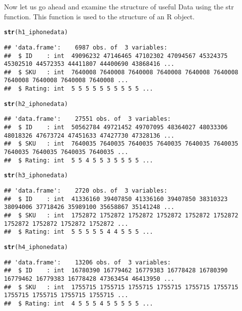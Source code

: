 \documentclass{article}\usepackage[]{graphicx}\usepackage[]{color}
\makeatletter
\newcommand{\hlstd}[1]{\textcolor[rgb]{0.345,0.345,0.345}{#1}}%
\newcommand{\hlkwd}[1]{\textcolor[rgb]{0.737,0.353,0.396}{\textbf{#1}}}%
\newenvironment{kframe}{%
 \def\at@end@of@kframe{}%
 \ifinner\ifhmode%
  \def\at@end@of@kframe{\end{minipage}}%
  \begin{minipage}{\columnwidth}%
 \fi\fi%
 \def\FrameCommand##1{\hskip\@totalleftmargin \hskip-\fboxsep
 \colorbox{shadecolor}{##1}\hskip-\fboxsep
     \hskip-\linewidth \hskip-\@totalleftmargin \hskip\columnwidth}%
 \MakeFramed {\advance\hsize-\width
   \@totalleftmargin\z@ \linewidth\hsize
   \@setminipage}}%
 {\par\unskip\endMakeFramed%
 \at@end@of@kframe}
\newenvironment{knitrout}{}{} %
\makeatother
\begin{document}
Now let us go ahead and examine the structure of  useful Data using the str function.
This function is used to the structure of an R object.
\begin{knitrout}
\color{fgcolor}\begin{kframe}
\begin{alltt}
\hlkwd{str}\hlstd{(h1_iphonedata)}
\end{alltt}
\begin{verbatim}
## 'data.frame':	6987 obs. of  3 variables:
##  $ ID    : int  49096232 47146465 47102302 47094567 45324375 45302510 44572353 44411807 44400690 43868416 ...
##  $ SKU   : int  7640008 7640008 7640008 7640008 7640008 7640008 7640008 7640008 7640008 7640008 ...
##  $ Rating: int  5 5 5 5 5 5 5 5 5 5 ...
\end{verbatim}
\begin{alltt}
\hlkwd{str}\hlstd{(h2_iphonedata)}
\end{alltt}
\begin{verbatim}
## 'data.frame':	27551 obs. of  3 variables:
##  $ ID    : int  50562784 49721452 49707095 48364027 48033306 48018326 47673724 47451633 47427730 47328136 ...
##  $ SKU   : int  7640035 7640035 7640035 7640035 7640035 7640035 7640035 7640035 7640035 7640035 ...
##  $ Rating: int  5 5 4 5 5 3 5 5 5 5 ...
\end{verbatim}
\begin{alltt}
\hlkwd{str}\hlstd{(h3_iphonedata)}
\end{alltt}
\begin{verbatim}
## 'data.frame':	2720 obs. of  3 variables:
##  $ ID    : int  41336160 39407850 41336160 39407850 38310323 38094006 37718426 35989100 35658867 35141248 ...
##  $ SKU   : int  1752872 1752872 1752872 1752872 1752872 1752872 1752872 1752872 1752872 1752872 ...
##  $ Rating: int  5 5 5 5 5 4 4 5 5 5 ...
\end{verbatim}
\begin{alltt}
\hlkwd{str}\hlstd{(h4_iphonedata)}
\end{alltt}
\begin{verbatim}
## 'data.frame':	13206 obs. of  3 variables:
##  $ ID    : int  16780390 16779462 16779383 16778428 16780390 16779462 16779383 16778428 47363454 46413950 ...
##  $ SKU   : int  1755715 1755715 1755715 1755715 1755715 1755715 1755715 1755715 1755715 1755715 ...
##  $ Rating: int  4 5 5 5 4 5 5 5 5 5 ...
\end{verbatim}
\end{kframe}
\end{knitrout}
\end{document}
